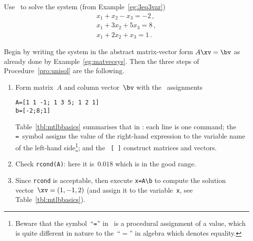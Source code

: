 \begin{example} \label{eg:3eq3varc}
Use \script\ to solve the system (from Example~\ref{eg:3eq3var})
\begin{equation*}
\begin{array}{l}
x_1+x_2-x_3=-2\,,\\
x_1+3x_2+5x_3=8\,,\\
x_1+2x_2+x_3=1\,.
\end{array}
\end{equation*}
\begin{solution} 
Begin by writing the system in the abstract matrix-vector form \(A\xv=\bv\) as already done by Example~\ref{eg:matvecsys}.
Then the three steps of Procedure~\ref{pro:unisol} are the following.
\begin{enumerate}
\item Form matrix~\(A\) and {column vector}~\(\bv\) with the \script\ assignments
\begin{verbatim}
A=[1 1 -1; 1 3 5; 1 2 1]
b=[-2;8;1]
\end{verbatim}
Table~\ref{tbl:mtlbbasics} summarises that in \script: each line is one command; the \verb|=|~symbol assigns the value of the right-hand expression to the variable name of the left-hand side\footnote{Beware that the symbol~``\texttt{=}'' in \script\ is a procedural assignment of a value, which is quite different in nature to the~``\(=\)'' in algebra which denotes equality.}; and the ~\verb|[ ]| construct matrices and vectors.
\item Check \verb|rcond(A)|: here it is~\(0.018\) which is in the good range.
\item Since \verb|rcond| is acceptable, then execute \verb|x=A\b| to compute the solution vector~\(\xv=(1,-1,2)\) (and assign it to the variable~\verb|x|, see Table~\ref{tbl:mtlbbasics}). 

\end{enumerate}
\end{solution}
\end{example}
